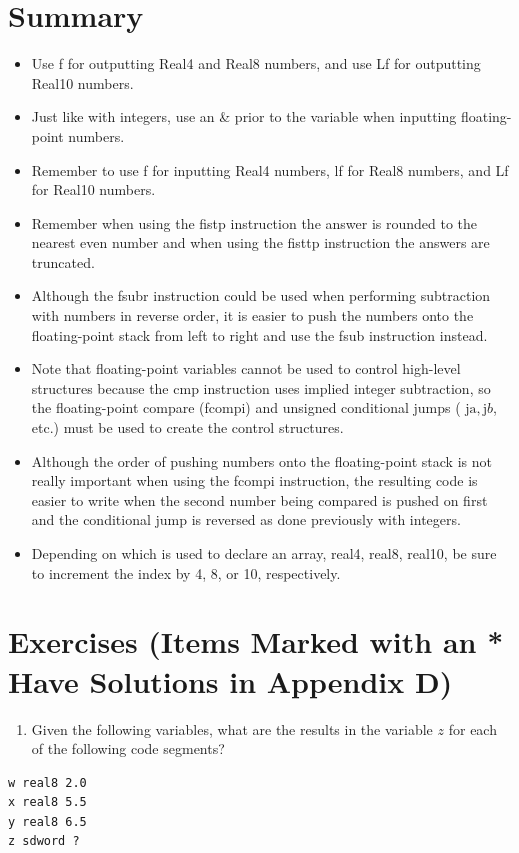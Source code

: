 \documentclass[10pt]{book}
\begin{document}
\section{Summary}
\begin{itemize}
  \item Use f for outputting Real4 and Real8 numbers, and use Lf for outputting Real10 numbers.
  \item Just like with integers, use an \& prior to the variable when inputting floating-point numbers.
  \item Remember to use f for inputting Real4 numbers, lf for Real8 numbers, and Lf for Real10 numbers.
  \item Remember when using the fistp instruction the answer is rounded to the nearest even number and when using the fisttp instruction the answers are truncated.
  \item Although the fsubr instruction could be used when performing subtraction with numbers in reverse order, it is easier to push the numbers onto the floating-point stack from left to right and use the fsub instruction instead.
  \item Note that floating-point variables cannot be used to control high-level structures because the cmp instruction uses implied integer subtraction, so the floating-point compare (fcompi) and unsigned conditional jumps ( $\mathrm{ja}, \mathrm{j} b$, etc.) must be used to create the control structures.
  \item Although the order of pushing numbers onto the floating-point stack is not really important when using the fcompi instruction, the resulting code is easier to write when the second number being compared is pushed on first and the conditional jump is reversed as done previously with integers.
  \item Depending on which is used to declare an array, real4, real8, real10, be sure to increment the index by 4, 8, or 10, respectively.
\end{itemize}

\section{Exercises (Items Marked with an * Have Solutions in Appendix D)}
\begin{enumerate}
  \item Given the following variables, what are the results in the variable $z$ for each of the following code segments?
\end{enumerate}
\begin{verbatim}
w real8 2.0
x real8 5.5
y real8 6.5
z sdword ?
\end{verbatim}
\end{document}
